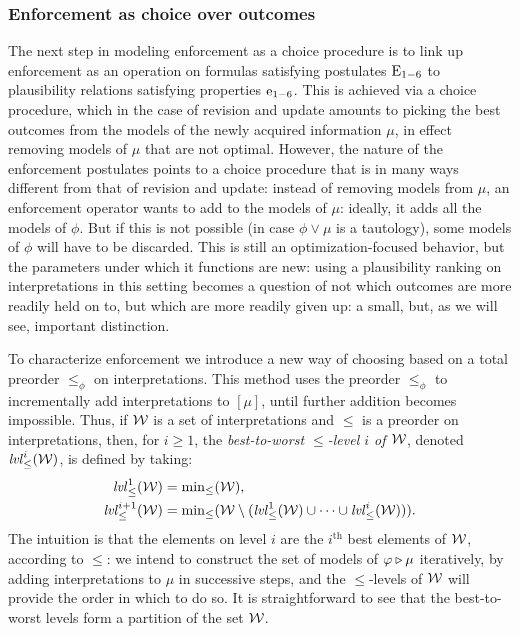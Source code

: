 \subsubsection{Enforcement as choice over outcomes}
The next step in modeling enforcement as a choice procedure
is to link up enforcement as an operation on formulas satisfying 
postulates $\mathrm{E}_{1-6}$ 
to plausibility relations satisfying properties $\mathrm{e}_{1-6}$.
This is achieved via a choice procedure, 
which in the case of revision and update amounts to picking 
the best outcomes from the models of the newly acquired 
information $\mu$, 
in effect removing models of $\mu$ that are not optimal. 
However, the nature of the enforcement postulates points 
to a choice procedure that is in many ways
different from that of revision and update:
instead of removing models from $\mu$,
an enforcement operator wants to add to the models of $\mu$:
ideally, it adds all the models of $\phi$.
But if this is not 
possible (in case $\phi\lor\mu$ is a tautology),
some models of $\phi$ will have to be discarded.
This is still an optimization-focused behavior, 
but the parameters under which it functions are new:
using a plausibility ranking on interpretations
in this setting 
becomes a question of not which outcomes are 
more readily held on to,
but which are more readily given up:
a small, but, as we will see, important distinction.

To characterize enforcement we introduce a new way 
of choosing based on a total preorder $\le_{\phi}$ on interpretations.
This method uses the preorder $\le_{\phi}$
to incrementally add interpretations to $[\mu]$,
until further addition becomes impossible.
Thus, if $\mathcal{W}$ is a set of interpretations and 
$\le$ is a preorder on interpretations,
then, for $i\geq 1$, the 
\emph{best-to-worst $\le$-level $i$ of $\mathcal{W}$}, denoted $\mathit{lvl}_\le^i(\mathcal{W})$,
is defined by taking:
\begin{align*}
\mathit{lvl}_\le^1(\mathcal{W}) &= {\operatorname{min}}_\le(\mathcal{W}),\\
\mathit{lvl}_\le^{i+1}(\mathcal{W}) &= {\operatorname{min}}_\le(\mathcal{W}\setminus(\mathit{lvl}^1_{\le}(\mathcal{W})\cup\dots\cup\mathit{lvl}_\le^i(\mathcal{W}))).
\end{align*}
The intuition is that the elements on 
level $i$ are the $i^\text{th}$ best elements of $\mathcal{W}$,
according to $\le$:
we intend to construct the set of models of $\varphi \triangleright \mu$
iteratively,
by adding interpretations to $\mu$ in successive steps,
and the $\le$-levels of $\mathcal{W}$ will provide the order 
in which to do so.
It is straightforward to see that 
the best-to-worst levels form a partition of the set $\mathcal{W}$.

